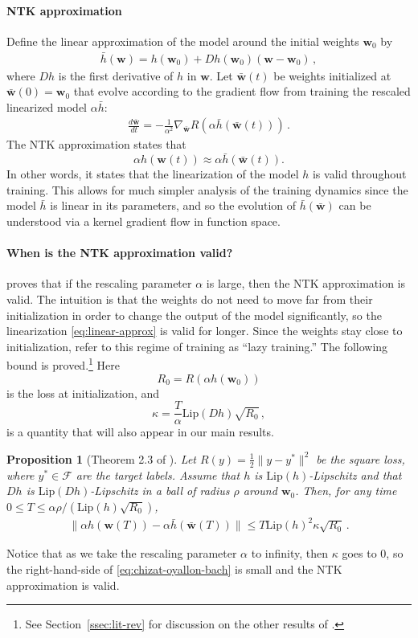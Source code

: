 \documentclass[11pt]{article} %
\newcommand{\<}{\langle}
\renewcommand{\>}{\rangle}
\def\bw{{\boldsymbol w}}
\def\cF{{\mathcal F}}
\def\cF{{\mathcal F}}
\def\barh{\bar{h}}
\def\barbw{\bar{\bw}}
\newcommand{\Lip}{\mathrm{Lip}}
\theoremstyle{plain}
\newtheorem{proposition}[theorem]{Proposition}
\theoremstyle{definition}
\theoremstyle{remark}
\begin{document}
\paragraph{NTK approximation} Define the linear approximation of the model around the initial weights $\bw_0$ by
\begin{align}\label{eq:linear-approx}
\bar{h}(\bw) = h(\bw_0) + Dh(\bw_0)(\bw - \bw_0)
\,,\end{align}
where $Dh$ is the first derivative of $h$ in $\bw$. Let $\barbw(t)$ be weights initialized at $\barbw(0) = \bw_0$ that evolve according to the gradient flow from training the rescaled linearized model $\alpha \bar{h}$:
\begin{align}\label{eq:grad-flow-bar}
\frac{d\barbw}{dt} = -\frac{1}{\alpha^2} \nabla_{\barbw} R(\alpha \barh(\barbw(t)))\,.
\end{align}
The NTK approximation states that $$\alpha h(\bw(t)) \approx \alpha \barh(\barbw(t)).$$ In other words, it states that the linearization of the model $h$ is valid throughout training. This allows for much simpler analysis of the training dynamics since the model $\bar{h}$ is linear in its parameters, and so the evolution of $\bar{h}(\bar\bw)$ can be understood via a kernel gradient flow in function space.

\paragraph{When is the NTK approximation valid?}

\cite{chizat2019lazy} proves that if the rescaling parameter $\alpha$ is large, then the NTK approximation is valid. The intuition is that the weights do not need to move far from their initialization in order to change the output of the model significantly, so the linearization \eqref{eq:linear-approx} is valid for longer. Since the weights stay close to initialization, \cite{chizat2019lazy} refer to this regime of training as ``lazy training.'' The following bound is proved.\footnote{See Section~\ref{ssec:lit-rev} for discussion on the other results of \cite{chizat2019lazy}.} Here $$R_0 = R(\alpha h(\bw_0))$$ is the loss at initialization, and $$\kappa = \frac{T}{\alpha}\Lip(Dh)\sqrt{R_0}\,,$$
is a quantity that will also appear in our main results. 
\begin{proposition}[Theorem 2.3 of \cite{chizat2019lazy}]\label{prop:chizat-et-al}
Let $R(y) = \frac{1}{2} \|y - y^*\|^2$ be the square loss, where $y^* \in \cF$ are the target labels. Assume that $h$ is $\Lip(h)$-Lipschitz and that $Dh$ is $\Lip(Dh)$-Lipschitz in a ball of radius $\rho$ around $\bw_0$. Then, for any time $0 \leq T \leq \alpha \rho / (\Lip(h) \sqrt{R_0})$,
\begin{align}\label{eq:chizat-oyallon-bach}\|\alpha h(\bw(T)) - \alpha \bar{h}(\bar{\bw}(T))\| \leq T \Lip(h)^2 \kappa \sqrt{R_0}\,.\end{align}
\end{proposition}
Notice that as we take the rescaling parameter $\alpha$ to infinity, then $\kappa$ goes to 0, so the right-hand-side of \eqref{eq:chizat-oyallon-bach} is small and the NTK approximation is valid.
\end{document}
